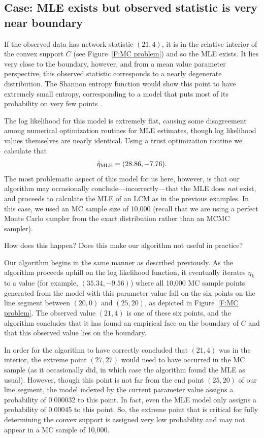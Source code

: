 \subsection{Case: MLE exists but observed statistic is very near boundary} 
\label{S:Example:9node problematic point}
If the observed data has network statistic $(21, 4)$, it is in the relative interior of 
the convex support $C$ (see Figure~\ref{F:MC problem}) and so the MLE exists.
It lies very close to the boundary, however, and from a mean value parameter 
perspective, this observed statistic 
corresponds to a nearly degenerate distribution. The Shannon entropy function would show this 
point to have extremely small entropy, corresponding to a model that puts most of its 
probability on very few points \citep{Rinaldo:2009}.

The log likelihood for this model is extremely flat, causing some disagreement among 
numerical optimization routines for MLE estimates, though log likelihood values 
themselves are nearly identical.  Using a trust optimization routine we calculate that 
\begin{align*}
\hat{\eta}_{\textrm{MLE}} = (28.86, -7.76).
\end{align*}
The most problematic aspect of this model for us here, however, is that our algorithm 
may occasionally conclude---incorrectly---that the MLE does \emph{not} exist, 
and proceeds to 
calculate the MLE of an LCM as in the previous examples.  In this case, we used
an MC sample size of 10,000 (recall that we are using a perfect Monte Carlo sampler
from the exact distribution rather than an MCMC sampler).

How does this happen?  Does this make our algorithm not useful in practice?

Our algorithm begins in the same manner as described previously.  As the algorithm 
proceeds uphill on the log likelihood function, it eventually iterates $\eta_k$ to a 
value (for example, $(35.34, -9.56)$) where all 10,000 MC sample points generated 
from the model with this parameter value fall on the six points on the line segment 
between $(20,0)$ and $(25,20)$, as depicted in Figure~\ref{F:MC problem}.  
The observed value $(21,4)$ is one of these six points, and the algorithm concludes
that it has found an empirical face on the boundary of $C$ and that 
this observed value lies on the boundary.

In order for the algorithm to have correctly concluded that $(21,4)$ was in the 
interior, the extreme point $(27,27)$ would need to have occurred in the MC sample
(as it occasionally did, in which case the algorithm found the MLE as usual).  
However, though this point is not far from the end point $(25,20)$ of our line
segment, the model indexed by the current parameter value 
assigns a probability of 0.000032 to this point.  In fact, even the 
MLE model only assigns a probability of 0.00045 to this point.  
So, the extreme point that is critical for fully determining the convex support 
is assigned very low probability and may not appear in a MC sample of 10,000.

